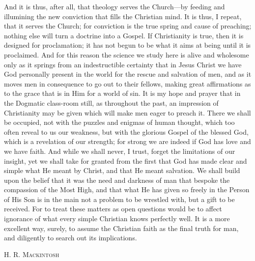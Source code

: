 \documentclass[12pt,a5paper]{article}
\begin{document}
And it is thus, after all, that theology serves the Church---by
feeding and illumining the new conviction that fills
the Christian mind. It is thus, I repeat, that it serves
the Church; for conviction is the true spring and cause of
preaching; nothing else will turn a doctrine into a Gospel.
If Christianity is true, then it is designed for proclamation;
it has not begun to be what it aims at being until it is
proclaimed. And for this reason the science we study here is
alive and wholesome only as it springs from an indestructible
certainty that in Jesus Christ we have God personally
present in the world for the rescue and salvation of men,
and as it moves men in consequence to go out to their
fellows, making great affirmations as to the grace that is
in Him for a world of sin. It is my hope and prayer that
in the Dogmatic class-room still, as throughout the past,
an impression of Christianity may be given which will
make men eager to preach it. There we shall be occupied,
not with the puzzles and enigmas of human thought,
which too often reveal to us our weakness, but with the
glorious Gospel of the blessed God, which is a revelation
of our strength; for strong we are indeed if God has
love and we have faith. And while we shall never, I
trust, forget the limitations of our insight, yet we shall
take for granted from the first that God has made clear
and simple what He meant by Christ, and that He meant
salvation. We shall build upon the belief that it was the
need and darkness of man that bespoke the compassion
of the Most High, and that what He has given so freely in
the Person of His Son is in the main not a problem to be
wrestled with, but a gift to be received. For to treat these
matters as open questions would be to affect ignorance of
what every simple Christian knows perfectly well. It is a
more excellent way, surely, to assume the Christian faith
as the final truth for man, and diligently to search out
its implications.

\begin{flushright}
\textsc{H. R. Mackintosh}
\end{flushright}
\end{document}
